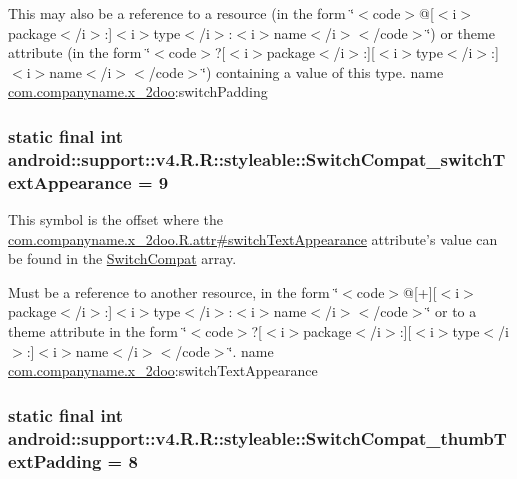 This may also be a reference to a resource (in the form \char`\"{}$<$code$>$@\mbox{[}$<$i$>$package$<$/i$>$:\mbox{]}$<$i$>$type$<$/i$>$:$<$i$>$name$<$/i$>$$<$/code$>$\char`\"{}) or theme attribute (in the form \char`\"{}$<$code$>$?\mbox{[}$<$i$>$package$<$/i$>$:\mbox{]}\mbox{[}$<$i$>$type$<$/i$>$:\mbox{]}$<$i$>$name$<$/i$>$$<$/code$>$\char`\"{}) containing a value of this type.  name \hyperlink{namespacecom_1_1companyname_1_1x__2doo}{com.companyname.x\_\-2doo}:switchPadding \hypertarget{classandroid_1_1support_1_1v4_1_1_r_1_1styleable_60389d42c7e89427896a6b7567ba54a5}{
\subsubsection[{SwitchCompat\_\-switchTextAppearance}]{\setlength{\rightskip}{0pt plus 5cm}static final int android::support::v4.R.R::styleable::SwitchCompat\_\-switchTextAppearance = 9}}
\label{classandroid_1_1support_1_1v4_1_1_r_1_1styleable_60389d42c7e89427896a6b7567ba54a5}


This symbol is the offset where the \hyperlink{classcom_1_1companyname_1_1x__2doo_1_1_r_1_1attr_57856a91d719e0f3416dda09b39ff2ba}{com.companyname.x\_\-2doo.R.attr\#switchTextAppearance} attribute's value can be found in the \hyperlink{classandroid_1_1support_1_1v4_1_1_r_1_1styleable_276d9c1ec80821a3e0fcdaa41daa75a0}{SwitchCompat} array.

Must be a reference to another resource, in the form \char`\"{}$<$code$>$@\mbox{[}+\mbox{]}\mbox{[}$<$i$>$package$<$/i$>$:\mbox{]}$<$i$>$type$<$/i$>$:$<$i$>$name$<$/i$>$$<$/code$>$\char`\"{} or to a theme attribute in the form \char`\"{}$<$code$>$?\mbox{[}$<$i$>$package$<$/i$>$:\mbox{]}\mbox{[}$<$i$>$type$<$/i$>$:\mbox{]}$<$i$>$name$<$/i$>$$<$/code$>$\char`\"{}.  name \hyperlink{namespacecom_1_1companyname_1_1x__2doo}{com.companyname.x\_\-2doo}:switchTextAppearance \hypertarget{classandroid_1_1support_1_1v4_1_1_r_1_1styleable_8ad125e9cbf83b9f8f070fdeab78cbbe}{
\subsubsection[{SwitchCompat\_\-thumbTextPadding}]{\setlength{\rightskip}{0pt plus 5cm}static final int android::support::v4.R.R::styleable::SwitchCompat\_\-thumbTextPadding = 8}}
\label{classandroid_1_1support_1_1v4_1_1_r_1_1styleable_8ad125e9cbf83b9f8f070fdeab78cbbe}


